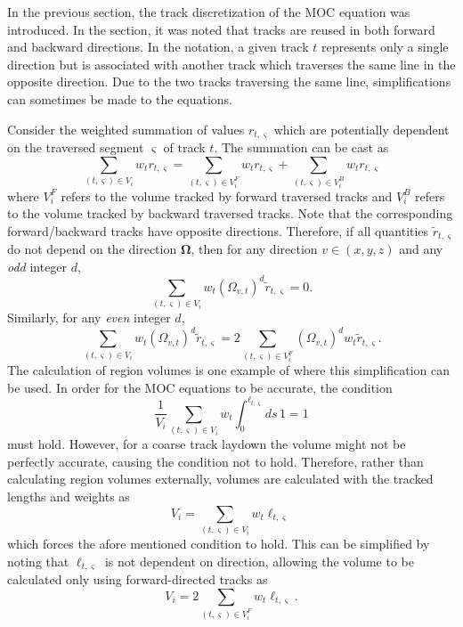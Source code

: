 In the previous section, the track discretization of the \ac{MOC} equation was introduced. In the section, it was noted that tracks are reused in both forward and backward directions. In the notation, a given track $t$ represents only a single direction but is associated with another track which traverses the same line in the opposite direction. Due to the two tracks traversing the same line, simplifications can sometimes be made to the equations.

Consider the weighted summation of values $r_{t,\varsigma}$ which are potentially dependent on the traversed segment $\varsigma$ of track $t$. The summation can be cast as
\begin{equation}
	\sum_{(t,\varsigma) \in V_i} w_t r_{t,\varsigma} = \sum_{(t,\varsigma) \in V^F_i} w_t r_{t,\varsigma} + \sum_{(t,\varsigma) \in V^B_i} w_t r_{t,\varsigma}
\end{equation}
where $V^F_i$ refers to the volume tracked by forward traversed tracks and $V^B_i$ refers to the volume tracked by backward traversed tracks. Note that the corresponding forward/backward tracks have opposite directions. Therefore, if all quantities $\tilde{r}_{t,\varsigma}$ do not depend on the direction $\mathbf{\Omega}$, then for any direction $v \in (x,y,z)$ and any \textit{odd} integer $d$,
\begin{equation}
\sum_{(t,\varsigma) \in V_i} w_t \left(\Omega_{v,t}\right)^d \tilde{r}_{t,\varsigma} = 0.
\end{equation}
Similarly, for any \textit{even} integer $d$,
\begin{equation}
\sum_{(t,\varsigma) \in V_i} w_t \left(\Omega_{v,t}\right)^d \tilde{r}_{t,\varsigma} = 2 \sum_{(t,\varsigma) \in V^F_i} \left(\Omega_{v,t}\right)^d w_t \tilde{r}_{t,\varsigma}.
\end{equation}
The calculation of region volumes is one example of where this simplification can be used. In order for the \ac{MOC} equations to be accurate, the condition
\begin{dmath}
	\frac{1}{V_i} \sum_{(t,\varsigma) \in V_i} w_{t} \int_{0}^{\ell_{t,\varsigma}} ds \, 1 = 1
\end{dmath}
must hold. However, for a coarse track laydown the volume might not be perfectly accurate, causing the condition not to hold. Therefore, rather than calculating region volumes externally, volumes are calculated with the tracked lengths and weights as
\begin{dmath}
	V_i = \sum_{(t,\varsigma) \in V_i} w_{t} \ell_{t,\varsigma}
\end{dmath}
which forces the afore mentioned condition to hold. This can be simplified by noting that $\ell_{t,\varsigma}$ is not dependent on direction, allowing the volume to be calculated only using forward-directed tracks as
\begin{equation}
V_i = 2 \sum_{(t,\varsigma) \in V^F_i} w_{t} \ell_{t,\varsigma}.
\end{equation}

